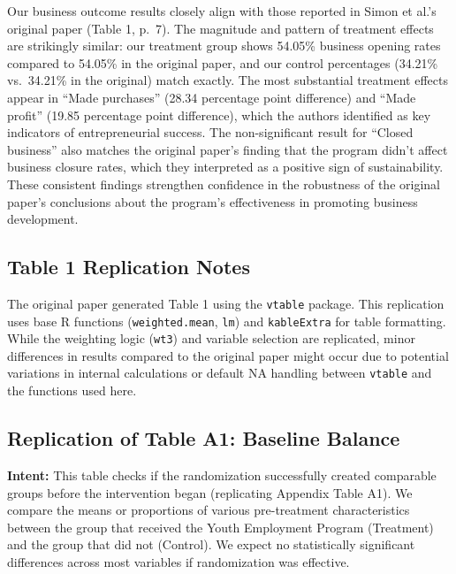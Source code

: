 \documentclass[
]{article}
\begin{document}
Our business outcome results closely align with those reported in Simon
et al.'s original paper (Table 1, p.~7). The magnitude and pattern of
treatment effects are strikingly similar: our treatment group shows
54.05\% business opening rates compared to 54.05\% in the original
paper, and our control percentages (34.21\% vs.~34.21\% in the original)
match exactly. The most substantial treatment effects appear in ``Made
purchases'' (28.34 percentage point difference) and ``Made profit''
(19.85 percentage point difference), which the authors identified as key
indicators of entrepreneurial success. The non-significant result for
``Closed business'' also matches the original paper's finding that the
program didn't affect business closure rates, which they interpreted as
a positive sign of sustainability. These consistent findings strengthen
confidence in the robustness of the original paper's conclusions about
the program's effectiveness in promoting business development.

\subsection{Table 1 Replication Notes}\label{table-1-replication-notes}

The original paper generated Table 1 using the \texttt{vtable} package.
This replication uses base R functions (\texttt{weighted.mean},
\texttt{lm}) and \texttt{kableExtra} for table formatting. While the
weighting logic (\texttt{wt3}) and variable selection are replicated,
minor differences in results compared to the original paper might occur
due to potential variations in internal calculations or default NA
handling between \texttt{vtable} and the functions used here.

\subsection{Replication of Table A1: Baseline
Balance}\label{replication-of-table-a1-baseline-balance}

\textbf{Intent:} This table checks if the randomization successfully
created comparable groups before the intervention began (replicating
Appendix Table A1). We compare the means or proportions of various
pre-treatment characteristics between the group that received the Youth
Employment Program (Treatment) and the group that did not (Control). We
expect no statistically significant differences across most variables if
randomization was effective.
\end{document}
